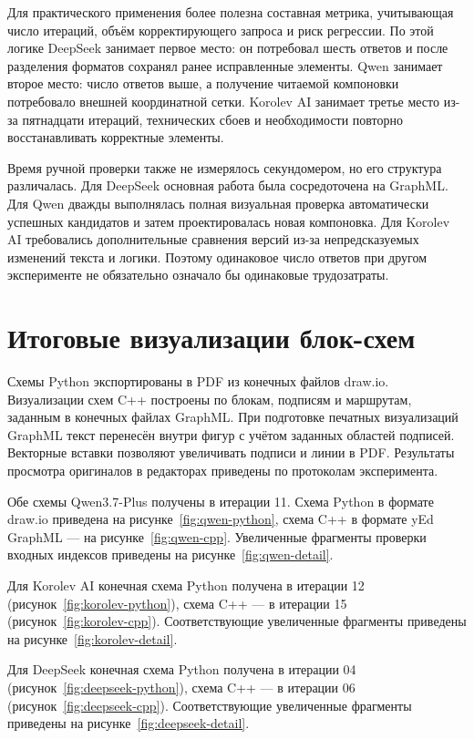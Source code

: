 \documentclass[a4paper,12pt]{extreport}
\begin{document}
Для практического применения более полезна составная метрика, учитывающая число итераций, объём корректирующего запроса и риск регрессии. По этой логике DeepSeek занимает первое место: он потребовал шесть ответов и после разделения форматов сохранял ранее исправленные элементы. Qwen занимает второе место: число ответов выше, а получение читаемой компоновки потребовало внешней координатной сетки. Korolev AI занимает третье место из-за пятнадцати итераций, технических сбоев и необходимости повторно восстанавливать корректные элементы.

Время ручной проверки также не измерялось секундомером, но его структура различалась. Для DeepSeek основная работа была сосредоточена на GraphML. Для Qwen дважды выполнялась полная визуальная проверка автоматически успешных кандидатов и затем проектировалась новая компоновка. Для Korolev AI требовались дополнительные сравнения версий из-за непредсказуемых изменений текста и логики. Поэтому одинаковое число ответов при другом эксперименте не обязательно означало бы одинаковые трудозатраты.

\section{Итоговые визуализации блок-схем}

Схемы Python экспортированы в PDF из конечных файлов draw.io. Визуализации схем C++ построены по блокам, подписям и маршрутам, заданным в конечных файлах GraphML. При подготовке печатных визуализаций GraphML текст перенесён внутри фигур с учётом заданных областей подписей. Векторные вставки позволяют увеличивать подписи и линии в PDF. Результаты просмотра оригиналов в редакторах приведены по протоколам эксперимента.

Обе схемы Qwen3.7-Plus получены в итерации 11. Схема Python в формате draw.io приведена на рисунке~\ref{fig:qwen-python}, схема C++ в формате yEd GraphML --- на рисунке~\ref{fig:qwen-cpp}. Увеличенные фрагменты проверки входных индексов приведены на рисунке~\ref{fig:qwen-detail}.

Для Korolev AI конечная схема Python получена в итерации 12 (рисунок~\ref{fig:korolev-python}), схема C++ --- в итерации 15 (рисунок~\ref{fig:korolev-cpp}). Соответствующие увеличенные фрагменты приведены на рисунке~\ref{fig:korolev-detail}.

Для DeepSeek конечная схема Python получена в итерации 04 (рисунок~\ref{fig:deepseek-python}), схема C++ --- в итерации 06 (рисунок~\ref{fig:deepseek-cpp}). Соответствующие увеличенные фрагменты приведены на рисунке~\ref{fig:deepseek-detail}.
\end{document}
